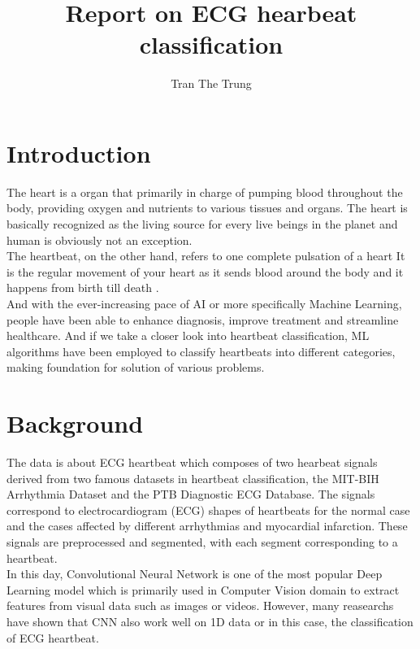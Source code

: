 \documentclass{article}
\title{Report on ECG hearbeat classification}
\author{Tran The Trung}
\begin{document}
\maketitle

\section{Introduction}

The heart is a organ that primarily in charge of pumping blood throughout the body, 
providing oxygen and nutrients to various tissues and organs. The heart is basically
recognized as the living source for every live beings in the planet and human is obviously
not an exception.\\

\noindent The heartbeat, on the other hand, refers to one complete pulsation of a heart
It is the regular movement of your heart as it sends blood around the body and it happens
from birth till death .\\

\noindent And with the ever-increasing pace of AI or more specifically Machine Learning, people
have been able to enhance diagnosis, improve treatment and streamline healthcare.
And if we take a closer look into heartbeat classification, ML algorithms have been
employed to classify heartbeats into different categories, making foundation for
solution of various problems.\\
 
\section{Background}
The data is about ECG heartbeat which composes of two hearbeat signals derived
from two famous datasets in heartbeat classification, the MIT-BIH Arrhythmia
Dataset and the PTB Diagnostic ECG Database. The signals correspond to
electrocardiogram (ECG) shapes of heartbeats for the normal case and the cases
affected by different arrhythmias and myocardial infarction. These signals
are preprocessed and segmented, with each segment corresponding to a heartbeat.\\

\noindent In this day, Convolutional Neural Network is one of the most popular
Deep Learning model which is primarily used in Computer Vision domain to extract
features from visual data such as images or videos. However, many reasearchs have shown
that CNN also work well on 1D data or in this case, the classification of
ECG heartbeat.
\end{document}
